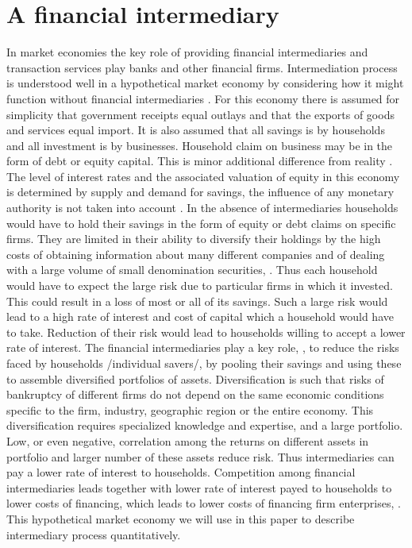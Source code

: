\documentclass[10pt]{article}
\begin{document}
\section{A financial intermediary}

In market economies the key role of providing financial intermediaries and transaction services play banks and other financial firms. Intermediation process is understood well in a hypothetical market economy by considering how it might function without financial intermediaries \cite{7}. For this economy there is assumed for simplicity that government receipts equal outlays and that the exports of goods and services equal import. It is also assumed that all savings is by households and all investment is by businesses. Household claim on business may be in the form of debt or equity capital. This is minor additional difference from reality \cite{7}. The level of interest rates and the associated valuation of equity in this economy is determined by supply and demand for savings, the influence of any monetary authority is not taken into account \cite{7}. In the absence of intermediaries households would have to hold their savings in the form of equity or debt claims on specific firms.
They are limited in their ability to diversify their holdings by the high costs of obtaining information about many different companies and of dealing with a large volume of small denomination securities, \cite{7}.  Thus each household would have to expect the large risk due to particular firms in which it invested. This could result in  a loss of most or all of its savings. Such a large risk would lead to a high rate of interest and cost of capital which a household would have to take. Reduction of their risk would lead to households willing to accept a lower rate of interest. The financial intermediaries play a key role, \cite{7}, to reduce the risks faced by households /individual savers/, by pooling their savings and using these to assemble diversified portfolios of assets. Diversification is such that risks of bankruptcy of different firms do not depend on the same economic conditions specific to the firm, industry, geographic region or the entire economy. This diversification requires specialized knowledge and expertise, and a large portfolio. Low, or even negative, correlation among the returns on different assets in portfolio and larger number of these assets reduce risk. Thus intermediaries can pay a lower rate of interest to households. Competition among financial intermediaries leads together with lower rate of interest payed to households to lower costs of financing, which leads to lower costs of financing firm enterprises, \cite{7}.
This hypothetical market economy we will use in this paper to describe intermediary process quantitatively.
\end{document}
